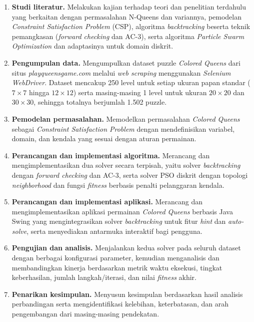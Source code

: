 \begin{enumerate}
	\item \textbf{Studi literatur.} Melakukan kajian terhadap teori dan penelitian terdahulu yang berkaitan dengan permasalahan N-Queens dan variannya, pemodelan \textit{Constraint Satisfaction Problem} (CSP), algoritma \textit{backtracking} beserta teknik pemangkasan (\textit{forward checking} dan AC-3), serta algoritma \textit{Particle Swarm Optimization} dan adaptasinya untuk domain diskrit.
	
	\item \textbf{Pengumpulan data.} Mengumpulkan dataset puzzle \textit{Colored Queens} dari situs \textit{playqueensgame.com} melalui \textit{web scraping} menggunakan \textit{Selenium WebDriver}. Dataset mencakup 250 level untuk setiap ukuran papan standar ($7 \times 7$ hingga $12 \times 12$) serta masing-masing 1 level untuk ukuran $20 \times 20$ dan $30 \times 30$, sehingga totalnya berjumlah 1.502 puzzle.
	
	\item \textbf{Pemodelan permasalahan.} Memodelkan permasalahan \textit{Colored Queens} sebagai \textit{Constraint Satisfaction Problem} dengan mendefinisikan variabel, domain, dan kendala yang sesuai dengan aturan permainan.
	
	\item \textbf{Perancangan dan implementasi algoritma.} Merancang dan mengimplementasikan dua solver secara terpisah, yaitu solver \textit{backtracking} dengan \textit{forward checking} dan AC-3, serta solver PSO diskrit dengan topologi \textit{neighborhood} dan fungsi \textit{fitness} berbasis penalti pelanggaran kendala.
	
	\item \textbf{Perancangan dan implementasi aplikasi.} Merancang dan mengimplementasikan aplikasi permainan \textit{Colored Queens} berbasis Java Swing yang mengintegrasikan solver \textit{backtracking} untuk fitur \textit{hint} dan \textit{auto-solve}, serta menyediakan antarmuka interaktif bagi pengguna.
	
	\item \textbf{Pengujian dan analisis.} Menjalankan kedua solver pada seluruh dataset dengan berbagai konfigurasi parameter, kemudian menganalisis dan membandingkan kinerja berdasarkan metrik waktu eksekusi, tingkat keberhasilan, jumlah langkah/iterasi, dan nilai \textit{fitness} akhir.
	
	\item \textbf{Penarikan kesimpulan.} Menyusun kesimpulan berdasarkan hasil analisis perbandingan serta mengidentifikasi kelebihan, keterbatasan, dan arah pengembangan dari masing-masing pendekatan.
\end{enumerate}

